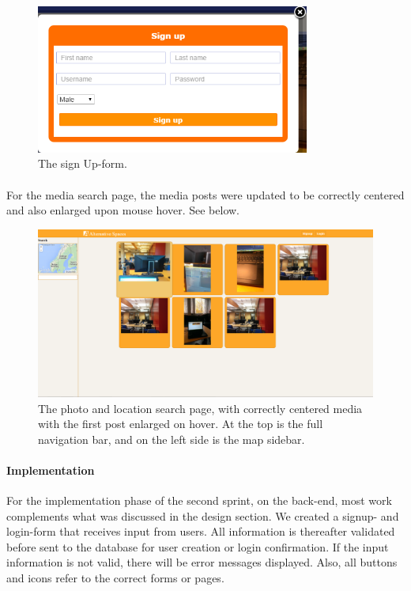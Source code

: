 \begin{figure}[ht!]
\centering
\includegraphics[width=90mm]{img/Sprint2-SignUpForm.png}
\caption{The sign Up-form. \label{overflow}}
\end{figure}

\paragraph{} For the media search page, the media posts were updated to be correctly centered and also enlarged upon mouse hover. See below. 

\begin{figure}[ht!]
\centering
\includegraphics[width={\linewidth}]{img/Sprint2-PhotoPage.png}
\caption{The photo and location search page, with correctly centered media with the first post enlarged on hover. At the top is the full navigation bar, and on the left side is the map sidebar. \label{overflow}}
\end{figure}



\paragraph{Implementation}
For the implementation phase of the second sprint, on the back-end, most work complements what was discussed in the design section. We created a signup- and login-form that receives input from users. All information is thereafter validated before sent to the database for user creation or login confirmation. If the input information is not valid, there will be error messages displayed. Also, all buttons and icons refer to the correct forms or pages. 

